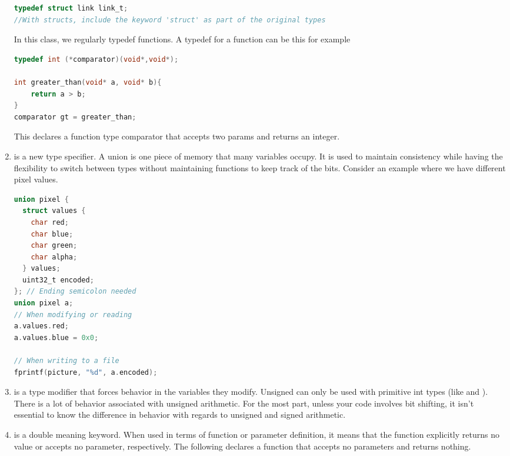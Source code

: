 \begin{enumerate}
\begin{lstlisting}[language=C]
typedef struct link link_t;
//With structs, include the keyword 'struct' as part of the original types
\end{lstlisting}

	      In this class, we regularly typedef functions.
        A typedef for a function can be this for example

	      \begin{lstlisting}[language=C]
typedef int (*comparator)(void*,void*);

int greater_than(void* a, void* b){
    return a > b;
}
comparator gt = greater_than;
\end{lstlisting}

	      This declares a function type comparator that accepts two  params and returns an integer.

	    \item {} is a new type specifier.
        A union is one piece of memory that many variables occupy.
        It is used to maintain consistency while having the flexibility to switch between types without maintaining functions to keep track of the bits.
        Consider an example where we have different pixel values.
	      \begin{lstlisting}[language=C]
union pixel {
  struct values {
    char red;
    char blue;
    char green;
    char alpha;
  } values;
  uint32_t encoded;
}; // Ending semicolon needed
union pixel a;
// When modifying or reading
a.values.red;
a.values.blue = 0x0;

// When writing to a file
fprintf(picture, "%d", a.encoded);
\end{lstlisting}
	    \item {} is a type modifier that forces  behavior in the variables they modify.
        Unsigned can only be used with primitive int types (like  and ).
        There is a lot of behavior associated with unsigned arithmetic. For the most part, unless your code involves bit shifting, it isn't essential to know the difference in behavior with regards to unsigned and signed arithmetic.

	    \item {} is a double meaning keyword.
        When used in terms of function or parameter definition, it means that the function explicitly returns no value or accepts no parameter, respectively. The following declares a function that accepts no parameters and returns nothing.


\end{enumerate}
